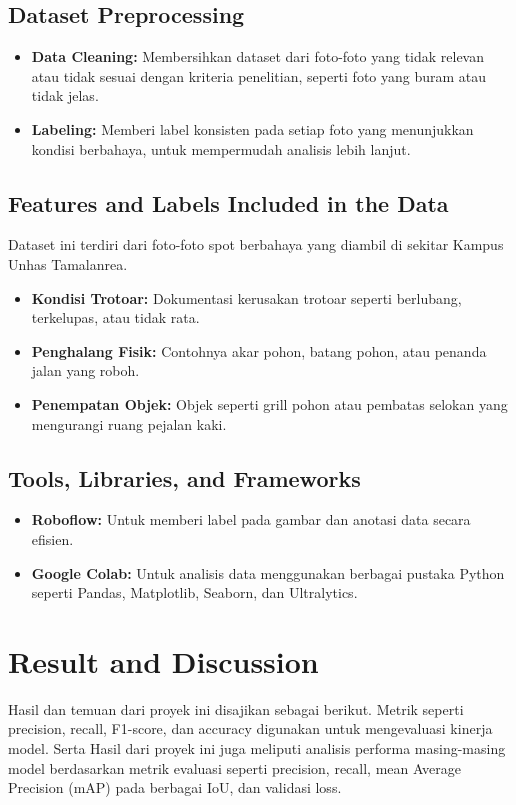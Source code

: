 \documentclass[12pt,a4paper]{article}
\begin{document}
\subsection{Dataset Preprocessing}
\begin{itemize}
    \item \textbf{Data Cleaning:} Membersihkan dataset dari foto-foto yang tidak relevan atau tidak sesuai dengan kriteria penelitian, seperti foto yang buram atau tidak jelas.
    \item \textbf{Labeling:} Memberi label konsisten pada setiap foto yang menunjukkan kondisi berbahaya, untuk mempermudah analisis lebih lanjut.
\end{itemize}

\subsection{Features and Labels Included in the Data}
Dataset ini terdiri dari foto-foto spot berbahaya yang diambil di sekitar Kampus Unhas Tamalanrea. 

\begin{itemize}
    \item \textbf{Kondisi Trotoar:} Dokumentasi kerusakan trotoar seperti berlubang, terkelupas, atau tidak rata.
    \item \textbf{Penghalang Fisik:} Contohnya akar pohon, batang pohon, atau penanda jalan yang roboh.
    \item \textbf{Penempatan Objek:} Objek seperti grill pohon atau pembatas selokan yang mengurangi ruang pejalan kaki.
\end{itemize}

\subsection{Tools, Libraries, and Frameworks}
\begin{itemize}
    \item \textbf{Roboflow:} Untuk memberi label pada gambar dan anotasi data secara efisien.
    \item \textbf{Google Colab:} Untuk analisis data menggunakan berbagai pustaka Python seperti Pandas, Matplotlib, Seaborn, dan Ultralytics.
\end{itemize}


\newpage
\section{Result and Discussion}
Hasil dan temuan dari proyek ini disajikan sebagai berikut. Metrik seperti precision, recall, F1-score, dan accuracy digunakan untuk mengevaluasi kinerja model. Serta Hasil dari proyek ini juga meliputi analisis performa masing-masing model berdasarkan metrik evaluasi seperti precision, recall, mean Average Precision (mAP) pada berbagai IoU, dan validasi loss.
\end{document}
